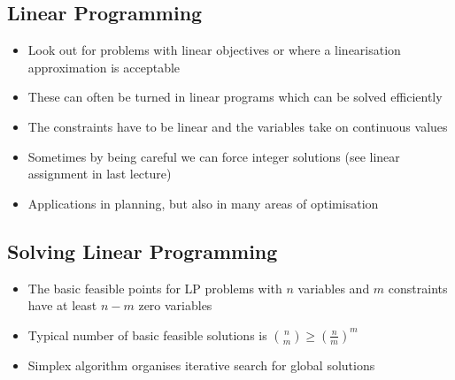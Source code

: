 \begin{slide}
\section{Linear Programming}

\begin{PauseHighLight}
  \begin{itemize}
  \item Look out for problems with linear objectives or where a
    linearisation approximation is acceptable\pause
  \item These can often be turned in linear programs which can be solved
    efficiently\pause
  \item The constraints have to be linear and the variables take on
    continuous values\pause
  \item Sometimes by being careful we can force integer solutions (see
    linear assignment in last lecture)\pause
  \item Applications in planning, but also in many areas of
    optimisation\pause
  \end{itemize}
\end{PauseHighLight}

\end{slide}


\begin{slide}
\section[-2]{Solving Linear Programming}

\pb\pause {}
\begin{minipage}{0.5\linewidth}
\begin{center}
  \pause
\end{center}  
\end{minipage}\hfil
\begin{minipage}{0.45\linewidth}
  \begin{itemize}
  \item The basic feasible points for LP problems with $n$ variables and
    $m$ constraints have at least $n-m$ zero variables\pause
  \item Typical number of basic feasible solutions is
    $\binom{n}{m}\geq\left(\frac{n}{m}\right)^m$\pause
  \item Simplex algorithm organises iterative search for global solutions\pause
  \end{itemize}
\end{minipage}

\end{slide}


